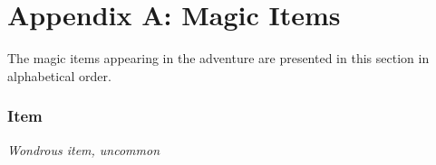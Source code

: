 \documentclass[module]{subfiles}
\begin{document}
\selectfont
\clearpage

\chapter{Appendix A: Magic Items}

The magic items appearing in the adventure are presented in this section in alphabetical order.\\

\subsection{Item}
\textit{Wondrous item, uncommon}\\

\lipsum[1]
\end{document}
